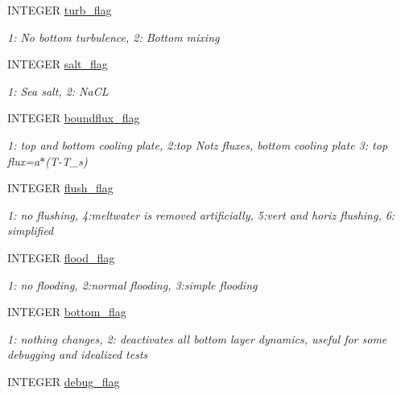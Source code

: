 \begin{DoxyCompactItemize}
INTEGER \hyperlink{namespacemo__data_a7cc5384bbfd0b56d61cfe78576ee886d}{turb\_\-flag}
\begin{DoxyCompactList}\small\item\em 1: No bottom turbulence, 2: Bottom mixing \item\end{DoxyCompactList}\item 
INTEGER \hyperlink{namespacemo__data_a0fb41b8dc5463c7215d278a301f17509}{salt\_\-flag}
\begin{DoxyCompactList}\small\item\em 1: Sea salt, 2: NaCL \item\end{DoxyCompactList}\item 
INTEGER \hyperlink{namespacemo__data_a6089c1127efc972f4488515f75ca8e80}{boundflux\_\-flag}
\begin{DoxyCompactList}\small\item\em 1: top and bottom cooling plate, 2:top Notz fluxes, bottom cooling plate 3: top flux=a$\ast$(T-\/T\_\-s) \item\end{DoxyCompactList}\item 
INTEGER \hyperlink{namespacemo__data_aa062c97301f949aea320e57c72926700}{flush\_\-flag}
\begin{DoxyCompactList}\small\item\em 1: no flushing, 4:meltwater is removed artificially, 5:vert and horiz flushing, 6: simplified \item\end{DoxyCompactList}\item 
INTEGER \hyperlink{namespacemo__data_a7e6cb2f19ab88a5903aa5574e5ec6b19}{flood\_\-flag}
\begin{DoxyCompactList}\small\item\em 1: no flooding, 2:normal flooding, 3:simple flooding \item\end{DoxyCompactList}\item 
INTEGER \hyperlink{namespacemo__data_ab9e96b3fd1d356487e156f8634c09732}{bottom\_\-flag}
\begin{DoxyCompactList}\small\item\em 1: nothing changes, 2: deactivates all bottom layer dynamics, useful for some debugging and idealized tests \item\end{DoxyCompactList}\item 
INTEGER \hyperlink{namespacemo__data_a014d834dc753f1d37c0575dc9037878a}{debug\_\-flag}

\end{DoxyCompactItemize}
